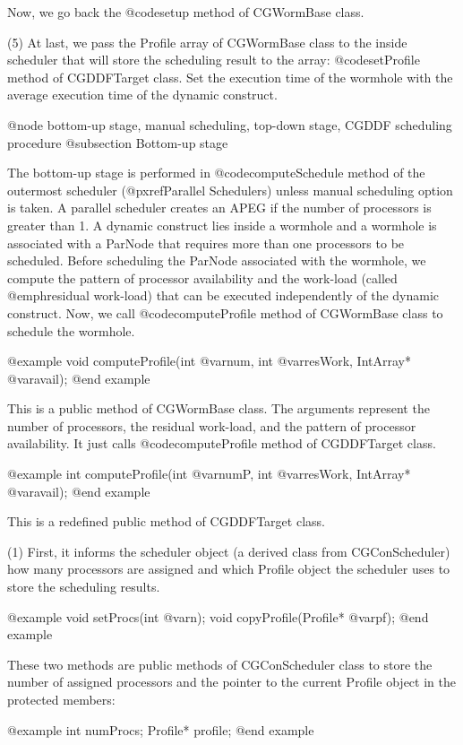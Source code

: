 {Now, we go back the @code{setup} method of CGWormBase class.

(5) At last, we pass the Profile array of CGWormBase class to the
inside scheduler that will store the scheduling result to the array:
@code{setProfile} method of CGDDFTarget class.
Set the execution time of the wormhole with the average execution time of
the dynamic construct.
 
@node bottom-up stage, manual scheduling, top-down stage, CGDDF scheduling procedure
@subsection Bottom-up stage

The bottom-up stage is performed in @code{computeSchedule} method of
the outermost scheduler (@pxref{Parallel Schedulers}) unless
manual scheduling option is taken. A parallel scheduler
creates an APEG if the number of processors is greater than 1. A dynamic
construct lies inside a wormhole and a wormhole is associated with a
ParNode that requires more than one processors to be scheduled. Before
scheduling the ParNode associated with the wormhole, we compute the
pattern of processor availability and the work-load (called
@emph{residual} work-load) that can be
executed independently of the dynamic construct. Now, we call
@code{computeProfile} method of CGWormBase class to schedule the wormhole.

@example
void computeProfile(int @var{num}, int @var{resWork}, IntArray* @var{avail});
@end example

This is a public method of CGWormBase class. The arguments represent the
number of processors, the residual work-load, and the pattern of processor
availability. It just calls @code{computeProfile} method of CGDDFTarget class.

@example
int computeProfile(int @var{numP}, int @var{resWork}, IntArray* @var{avail});
@end example

This is a redefined public method of CGDDFTarget class. 

(1) First, it informs the
scheduler object (a derived class from CGConScheduler) how many processors
are assigned and which Profile object the scheduler uses to store the
scheduling results.

@example
void setProcs(int @var{n});
void copyProfile(Profile* @var{pf});
@end example

These two methods are public methods of CGConScheduler class to store the
number of assigned processors and the pointer to the current Profile object
in the protected members:

@example
int numProcs;
Profile* profile;
@end example

}

